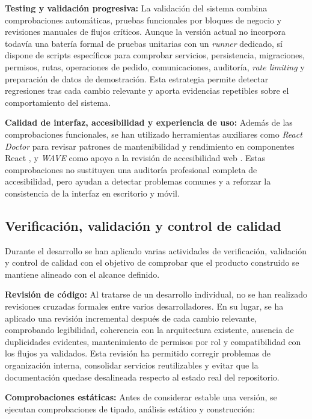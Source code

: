 \textbf{Testing y validación progresiva:} La validación del sistema combina comprobaciones automáticas, pruebas funcionales por bloques de negocio y revisiones manuales de flujos críticos. Aunque la versión actual no incorpora todavía una batería formal de pruebas unitarias con un \textit{runner} dedicado, sí dispone de scripts específicos para comprobar servicios, persistencia, migraciones, permisos, rutas, operaciones de pedido, comunicaciones, auditoría, \textit{rate limiting} y preparación de datos de demostración. Esta estrategia permite detectar regresiones tras cada cambio relevante y aporta evidencias repetibles sobre el comportamiento del sistema.

\textbf{Calidad de interfaz, accesibilidad y experiencia de uso:} Además de las comprobaciones funcionales, se han utilizado herramientas auxiliares como \textit{React Doctor} para revisar patrones de mantenibilidad y rendimiento en componentes React \citep{reactdoctor2026}, y \textit{WAVE} como apoyo a la revisión de accesibilidad web \citep{wavewebaim2026}. Estas comprobaciones no sustituyen una auditoría profesional completa de accesibilidad, pero ayudan a detectar problemas comunes y a reforzar la consistencia de la interfaz en escritorio y móvil.

\subsection{Verificación, validación y control de calidad}

Durante el desarrollo se han aplicado varias actividades de verificación, validación y control de calidad con el objetivo de comprobar que el producto construido se mantiene alineado con el alcance definido.

\textbf{Revisión de código:} Al tratarse de un desarrollo individual, no se han realizado revisiones cruzadas formales entre varios desarrolladores. En su lugar, se ha aplicado una revisión incremental después de cada cambio relevante, comprobando legibilidad, coherencia con la arquitectura existente, ausencia de duplicidades evidentes, mantenimiento de permisos por rol y compatibilidad con los flujos ya validados. Esta revisión ha permitido corregir problemas de organización interna, consolidar servicios reutilizables y evitar que la documentación quedase desalineada respecto al estado real del repositorio.

\textbf{Comprobaciones estáticas:} Antes de considerar estable una versión, se ejecutan comprobaciones de tipado, análisis estático y construcción:

